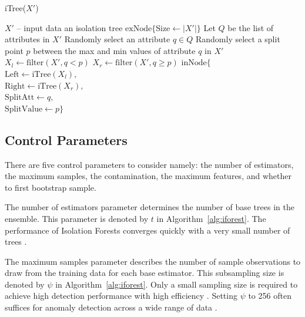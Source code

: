 \documentclass[10pt, conference]{IEEEtran}
\begin{document}
\begin{algorithm}[H]
	\caption{iTree($X'$)}
	\label{alg:itree}
	\begin{algorithmic}[1]
		\Require $X'$ -- input data  
		\Ensure an isolation tree
		\Return $\text{exNode}\{\text{Size} \leftarrow |X'|\}$
		\Else
		\State Let $Q$ be the list of attributes in $X'$
		\State Randomly select an attribute $q \in Q$
		\State Randomly select a split point $p$ between the max and min values of attribute $q$ in $X'$
		\State $X_l \gets \text{filter}(X', q < p)$
		\State $X_r \gets \text{filter}(X', q \ge p)$
		\Return $\text{inNode}\{$ \\
		\hspace*{1.5em} $\text{Left} \leftarrow \text{iTree}(X_l),$ \\
		\hspace*{1.5em} $\text{Right} \leftarrow \text{iTree}(X_r),$ \\
		\hspace*{1.5em} $\text{SplitAtt} \leftarrow q,$ \\
		\hspace*{1.5em} $\text{SplitValue} \leftarrow p\}$ 
		\EndIf
	\end{algorithmic}
\end{algorithm}




\subsection{Control Parameters}
There are five control parameters to consider namely: the number of estimators, the maximum samples, the contamination, the maximum features, and whether to first bootstrap sample.

The number of estimators parameter determines the number of base trees in the ensemble. This parameter is denoted by $t$ in Algorithm~\ref{alg:iforest}. The performance of Isolation Forests converges quickly with a very small number of trees \cite{iforest}.


The maximum samples parameter describes the number of sample observations to draw from the training data for each base estimator. This subsampling size is denoted by $\psi$ in Algorithm~\ref{alg:iforest}. Only a small sampling size is required to achieve high detection performance with high efficiency \cite{iforest}. Setting $\psi$ to 256 often suffices for anomaly detection across a wide range of data \cite{iforest2}.
\end{document}
